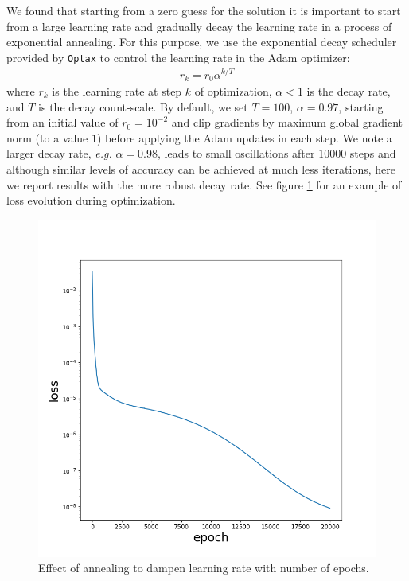 \documentclass{elsarticle}
\begin{document}
We found that starting from a zero guess for the solution it is important to start from a large learning rate and gradually decay the learning rate in a process of exponential annealing. For this purpose, we use the exponential decay scheduler provided by \texttt{Optax} \cite{optax2020github} to control the learning rate in the Adam \cite{kingma2014adam} optimizer:
\begin{align*}
r_{k} = r_0 \alpha^{k / T}
\end{align*}
where $r_k$ is the learning rate at step $k$ of optimization, $\alpha<1$ is the decay rate, and $T$ is the decay count-scale. By default, we set $T=100$, $\alpha=0.97$, starting from an initial value of $r_0=10^{-2}$ and clip gradients by maximum global gradient norm (to a value $1$) \cite{gradClipping} before applying the Adam updates in each step. We note a larger decay rate, \textit{e.g.} $\alpha=0.98$, leads to small oscillations after $10000$ steps and although similar levels of accuracy can be achieved at much less iterations, here we report results with the more robust decay rate. See figure \ref{fig::optimization} for an example of loss evolution during optimization.

\begin{figure}[ht]
\centering
\includegraphics[width=0.85\linewidth]{figures/poisson_solver_loss_with_annealing.png}
\caption{Effect of annealing to dampen learning rate with number of epochs. }
\label{fig::optimization}
\end{figure}
\end{document}
